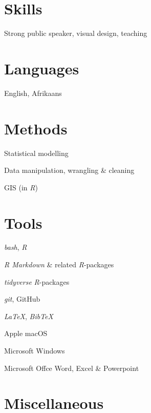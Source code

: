 \documentclass[10pt]{article}
\begin{document}
\begin{multicols}{2}

\section*{Skills} %

Strong public speaker, visual design, teaching

\section*{Languages} %

English, Afrikaans

\section*{Methods} %

Statistical modelling

Data manipulation, wrangling \& cleaning

GIS (in \textit{R})

\columnbreak

\section*{Tools} %

\textit{bash}, \textit{R}

\textit{R Markdown} \& related \textit{R}-packages

\textit{tidyverse} \textit{R}-packages

\textit{git}, GitHub

\textit{LaTeX}, \textit{BibTeX}

Apple macOS

Microsoft Windows

Microsoft Offce Word, Excel \& Powerpoint

\end{multicols}

\clearpage %

\section*{Miscellaneous} %
\end{document}
